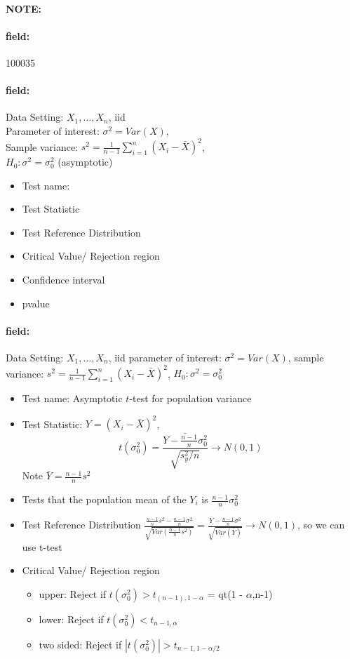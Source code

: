 \documentclass[12pt]{article}
\newenvironment{note}{\paragraph{NOTE:}}{}
\newenvironment{field}{\paragraph{field:}}{}
\begin{document}
\begin{note} \begin{field} \tiny 100035 \end{field}
 \begin{field}
  Data Setting: $X_1, \ldots, X_n$, iid \\
  Parameter of interest: $\sigma^2 = Var(X)$,\\
  Sample variance: $s^2 = \frac{1}{n-1} \sum_{i=1}^n(X_i - \bar{X})^2$, \\
  $H_0: \sigma^2 = \sigma_0^2$ (asymptotic)
  \begin{itemize}
   \item Test name:
   \item Test Statistic
   \item Test Reference Distribution
   \item Critical Value/ Rejection region
   \item Confidence interval
   \item pvalue
  \end{itemize}
 \end{field}
 \begin{field}
  Data Setting: $X_1, \ldots, X_n$, iid parameter of interest: $\sigma^2 = Var(X)$, sample variance: $s^2 = \frac{1}{n-1} \sum_{i=1}^n(X_i - \bar{X})^2$, $H_0: \sigma^2 = \sigma_0^2$
  \begin{itemize}
   \item Test name: Asymptotic $t$-test for population variance
   \item Test Statistic: $Y = (X_i - \bar{X})^2$, $$ t(\sigma_0^2)  = \frac{\bar{Y - \frac{n-1}{n}\sigma_0^2}}{\sqrt{s_y^2/n}} \to N(0,1)$$
         Note $\bar{Y} = \frac{n-1}{n}s^2$
   \item Tests that the population mean of the $Y_i$ is $\frac{n-1}{n}\sigma_0^2$
   \item Test Reference Distribution $ \frac{\frac{n-1}{n}s^2 - \frac{n-1}{n}\sigma^2}{\sqrt{Var(\frac{n-1}{n}s^2)}} = \frac{\bar{Y}- \frac{n-1}{n}\sigma^2}{\sqrt{Var(\bar{Y})}} \to N(0,1)$, so we can use t-test
   \item Critical Value/ Rejection region
         \begin{itemize}
          \item upper: Reject if $t(\sigma_0^2) > t_{(n-1),1-\alpha}$ = qt(1 - $\alpha$,n-1)
          \item lower: Reject if $t(\sigma_0^2)  < t_{n-1,\alpha}$
          \item two sided: Reject if $|t(\sigma_0^2)| > t_{n-1, 1 - \alpha/2}$

\end{itemize}
\end{itemize}
\end{field}
\end{note}
\end{document}
